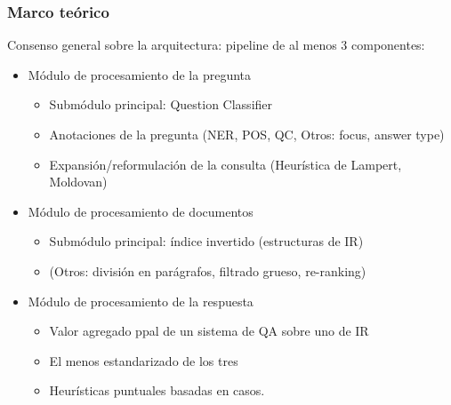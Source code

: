 \begin{frame}[<+->]
\frametitle{Marco teórico}
  Consenso general sobre la arquitectura: pipeline de al menos 3 componentes:
  \begin{itemize}
    \item Módulo de procesamiento de la pregunta
    \begin{itemize}
      \item Submódulo principal: Question Classifier
      \item Anotaciones de la pregunta (NER, POS, QC, Otros: focus, answer type)
      \item Expansión/reformulación de la consulta (Heurística de Lampert, Moldovan)
    \end{itemize}
    \item Módulo de procesamiento de documentos
    \begin{itemize}
      \item Submódulo principal: índice invertido (estructuras de IR)
      \item (Otros: división en parágrafos, filtrado grueso, re-ranking)
    \end{itemize}
    \item Módulo de procesamiento de la respuesta
    \begin{itemize}
      \item Valor agregado ppal de un sistema de QA sobre uno de IR
      \item El menos estandarizado de los tres
      \item Heurísticas puntuales basadas en casos.
    \end{itemize}
  \end{itemize}

\end{frame}

